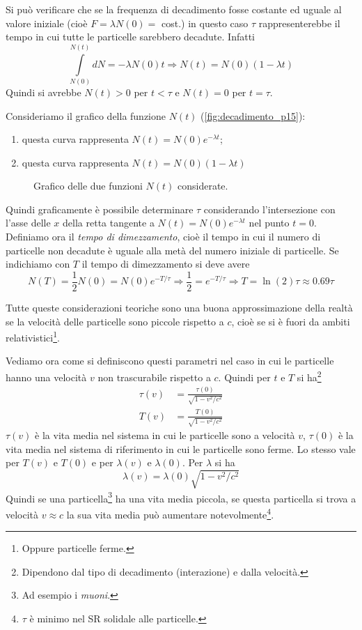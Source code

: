 Si può verificare che se la frequenza di decadimento fosse costante ed uguale al
valore iniziale (cioè $F = \lambda N(0)=$ cost.) in questo caso $\tau$
rappresenterebbe il tempo in cui tutte le particelle sarebbero decadute. Infatti
\[
\int\limits^{N(t)}_{N(0)}dN = -\lambda N(0)t\Rightarrow N(t) = N(0)(1-\lambda t)
\]
Quindi si avrebbe $N(t) > 0$ per $t<\tau$ e $N(t) = 0$ per $t=\tau$.

Consideriamo il grafico della funzione $N(t)$ (\autoref{fig:decadimento_p15}):
\begin{enumerate}
 \item questa curva rappresenta $N(t) = N(0)e^{-\lambda t}$;
 \item questa curva rappresenta $N(t) = N(0)(1-\lambda t)$
\end{enumerate}
\begin{figure}[htbp]
\centering
\caption{Grafico delle due funzioni $N(t)$ considerate.}
\label{fig:decadimento_p15}

\end{figure}
Quindi graficamente è possibile determinare $\tau$ considerando l'intersezione
con l'asse delle $x$ della retta tangente a $N(t) = N(0)e^{-\lambda t}$ nel
punto $t=0$. Definiamo ora il \textit{tempo di
dimezzamento}, cioè il tempo in cui il numero di particelle non decadute è
uguale alla metà del numero iniziale di particelle. Se indichiamo con $T$ il
tempo di dimezzamento si deve avere
\begin{equation}
 N(T) = \frac{1}{2}N(0) = N(0)e^{- T/\tau} \Rightarrow \frac{1}{2} = e^{-T/\tau} \Rightarrow T = \ln(2)\tau\approx 0.69\tau
\end{equation}

Tutte queste considerazioni teoriche sono una buona approssimazione della realtà
se la velocità delle particelle sono piccole rispetto a $c$, cioè se si è fuori
da ambiti relativistici\footnote{Oppure particelle ferme.}.

Vediamo ora come si definiscono questi parametri nel caso in cui le particelle
hanno una velocità $v$ non trascurabile rispetto a $c$. Quindi per $t$ e $T$ si
ha\footnote{Dipendono dal tipo di decadimento (interazione) e dalla velocità.}
\begin{align}
 \tau(v) &= \frac{\tau(0)}{\sqrt{1-v^2/c^2}}\\
 T(v) &= \frac{T(0)}{\sqrt{1-v^2/c^2}}
\end{align}
$\tau(v)$ è la vita media nel sistema in cui le particelle sono a velocità $v$,
$\tau(0)$ è la vita media nel sistema di riferimento in cui le particelle sono
ferme. Lo stesso vale per $T(v)$ e $T(0)$ e per $\lambda(v)$ e $\lambda(0)$. Per
$\lambda$ si ha
\begin{equation}
 \lambda(v) = \lambda(0)\sqrt{1-v^2/c^2}
\end{equation}
Quindi se una particella\footnote{Ad esempio i \textit{muoni}. } ha una vita
media piccola, se questa particella si trova a velocità $v\approx c$ la sua vita
media può aumentare notevolmente\footnote{$\tau$ è minimo nel \textsc{SR}
solidale alle particelle. }.

